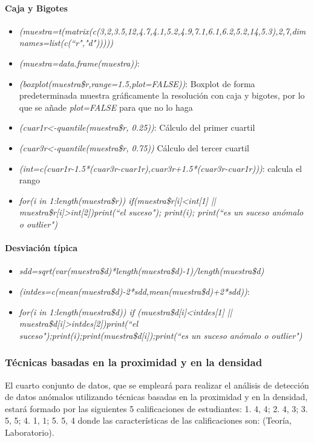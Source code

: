 \documentclass[a4paper, 12pt]{article}
\begin{document}
        \paragraph{Caja y Bigotes}
        \begin{itemize}
            \item \emph{(muestra=t(matrix(c(3,2,3.5,12,4.7,4.1,5.2,4.9,7.1,6.1,6.2,5.2,14,5.3),2,7,dimnames=list(c(\textquotedblleft r","d")))))}
            \item \emph{(muestra=data.frame(muestra))}: 
            \item \emph{(boxplot(muestra\$r,range=1.5,plot=FALSE))}: Boxplot de forma predeterminada muestra gráficamente la resolución con caja y bigotes, por lo que se añade \emph{plot=FALSE} para que no lo haga
            \item \emph{(cuar1r<-quantile(muestra\$r, 0.25))}: Cálculo del primer cuartil
            \item \emph{(cuar3r<-quantile(muestra\$r, 0.75))} Cálculo del tercer cuartil
            \item \emph{(int=c(cuar1r-1.5*(cuar3r-cuar1r),cuar3r+1.5*(cuar3r-cuar1r)))}: calcula el rango
            \item \emph{for(i in 1:length(muestra\$r)) {if(muestra\$r[i]<int[1] || muestra\$r[i]>int[2]){print(\textquotedblleft el suceso"); print(i); print(\textquotedblleft es un suceso anómalo o outlier")}}}
        \end{itemize}

        \paragraph{Desviación típica}
        \begin{itemize}
            \item \emph{sdd=sqrt(var(muestra\$d)*length(muestra\$d)-1)/length(muestra\$d)}
            \item \emph{(intdes=c(mean(muestra\$d)-2*sdd,mean(muestra\$d)+2*sdd))}: 
            \item \emph{for(i in 1:length(muestra\$d)) {if (muestra\$d[i]<intdes[1] || muestra\$d[i]>intdes[2]){print(\textquotedblleft el suceso");print(i);print(muestra\$d[i]);print(\textquotedblleft es un suceso anómalo o outlier")}}}
        \end{itemize}
    
    \subsubsection{Técnicas basadas en la proximidad y en la densidad}
    El cuarto conjunto de datos, que se empleará para realizar el análisis de detección de datos anómalos utilizando técnicas basadas en la proximidad y en la densidad, estará formado por las siguientes 5 calificaciones de estudiantes: 1. {4, 4}; 2. {4, 3}; 3. {5, 5}; 4. {1, 1}; 5. {5, 4} donde las características de las calificaciones son: (Teoría, Laboratorio).
\end{document}

